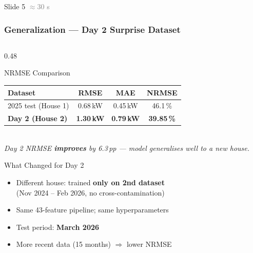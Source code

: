 \documentclass[aspectratio=169, 10pt]{beamer}
\newcommand{\good}[1]{\textcolor{greenok}{\textbf{#1}}}
\begin{document}
\begin{frame}{Slide 5 \hfill \textcolor{gray}{\small$\approx$30 s}}
  \frametitle{Generalization --- Day 2 Surprise Dataset}

  \begin{columns}[T]
    \begin{column}{0.48\textwidth}
      \begin{block}{NRMSE Comparison}
        \renewcommand{\arraystretch}{1.4}
        \begin{tabular}{lccc}
          \toprule
          \textbf{Dataset} & \textbf{RMSE} & \textbf{MAE} & \textbf{NRMSE} \\
          \midrule
          2025 test (House 1) & 0.68\,kW & 0.45\,kW &
            \textcolor{energyblue}{46.1\,\%} \\
          \rowcolor{solaryellow!30}
          \textbf{Day 2 (House 2)} & \textbf{1.30\,kW} & \textbf{0.79\,kW} &
            \good{\textbf{39.85\,\%}} \\
          \bottomrule
        \end{tabular}\\[4pt]
        \small\textit{Day 2 NRMSE \textbf{improves} by 6.3\,pp --- model
        generalises well to a new house.}
      \end{block}

      \vspace{6pt}
      \begin{block}{What Changed for Day 2}
        \small
        \begin{itemize}
          \item Different house: trained \textbf{only on 2nd dataset}\\
                (Nov 2024 -- Feb 2026, no cross-contamination)
          \item Same 43-feature pipeline; same hyperparameters
          \item Test period: \textbf{March 2026}
          \item More recent data (15 months) $\Rightarrow$ lower NRMSE
        \end{itemize}
      \end{block}
    \end{column}


\end{columns}
\end{frame}
\end{document}
